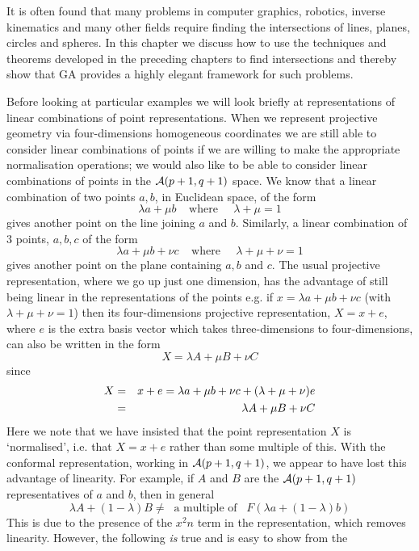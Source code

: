 It is often found that many problems in computer graphics,
robotics, inverse kinematics and many other fields require
finding the intersections of lines, planes, circles and spheres.
In this chapter we discuss how to use the techniques and theorems
developed in the preceding chapters to find intersections
and thereby show that GA provides a highly elegant framework
for such problems.

Before looking at particular examples we will look
briefly at representations of linear combinations of
point representations. When we represent projective geometry via four-dimensions
homogeneous coordinates we are still able to consider
linear combinations of points if we are willing to make
the appropriate normalisation operations; we would also
like to be able to consider linear combinations of points
in the ${\mathcal{A}}(p+1,q+1)$ space. We know that a linear
combination of two points $a,b$, in Euclidean space, of
the form
%
\[  \lambda a + \mu b \;\;\;\; \mbox{where} \;\;\;\;\; \lambda + \mu =1  \]
%
gives another point on the line joining $a$ and $b$.
Similarly, a linear combination of 3 points, $a,b,c$ of
the form
%
\[  \lambda a + \mu b  + \nu c  \;\;\;\; \mbox{where} \;\;\;\;\; \lambda + \mu  + \nu=1  \]
%
gives another point on the plane containing $a,b$ and
$c$. The usual projective representation, where we go up
just one dimension, has the advantage of still being
linear in the representations of the points e.g. if
$x=\lambda a + \mu b + \nu c$  (with $\lambda + \mu + \nu
=1$) then its four-dimensions projective representation, $X=x+e$,
where $e$ is the extra basis vector which takes three-dimensions to four-dimensions,
can also be written in the form
%
\[ X = \lambda A + \mu B + \nu C  \]
%
since
%
\begin{eqnarray}
 X  & =  & x+e=\lambda a + \mu b + \nu c +
 (\lambda+\mu+\nu)e \nonumber \\
 &    = &  \lambda A + \mu B + \nu C  \nonumber
 \end{eqnarray}
Here we note that we have insisted that the point representation
$X$ is `normalised', i.e. that $X=x + e$ rather than some
multiple of this. With the conformal representation,
working in ${\mathcal{A}}(p+1,q+1)$, we appear to have lost
this advantage of linearity. For example, if $A$ and $B$
are the ${\mathcal{A}}(p+1,q+1)$ representatives of $a$ and
$b$, then in general
%
\[ \lambda A + (1-\lambda)B \ne \;\;\mbox{a multiple of}\;\;\; F(\lambda a + (1-\lambda)b)  \]
%
This is due to the presence of the $x^2n$ term in the
representation, which removes linearity. However, the
following \emph{is} true and is easy to show from the
